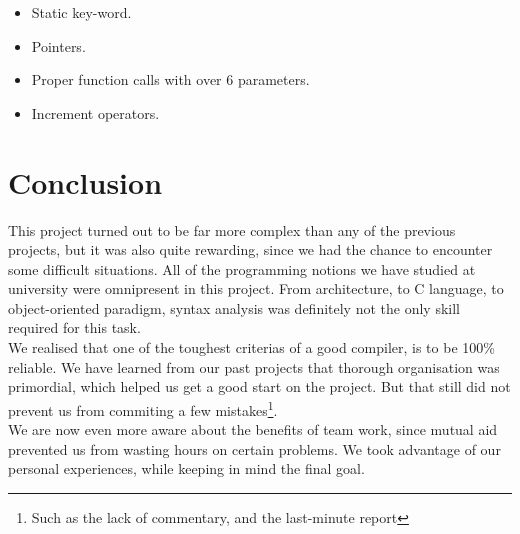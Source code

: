 \documentclass{scrartcl}
\begin{document}
\begin{itemize}
\item Static key-word.
\item Pointers.
\item Proper function calls with over 6 parameters.
\item Increment operators.
\end{itemize}

\section{Conclusion}
This project turned out to be far more complex than any of the previous projects, but it was also quite rewarding, since we had the chance to encounter some difficult situations. All of the programming notions we have studied at university were omnipresent in this project. From architecture, to C language, to object-oriented paradigm, syntax analysis was definitely not the only skill required for this task.\\

We realised that one of the toughest criterias of a good compiler, is to be 100\% reliable.
We have learned from our past projects that thorough organisation was primordial, which helped us get a good start on the project. But that still did not prevent us from commiting a few mistakes\footnote{Such as the lack of commentary, and the last-minute report}.\\

We are now even more aware about the benefits of team work, since mutual aid prevented us from wasting hours on certain problems. We took advantage of our personal experiences, while keeping in mind the final goal.
\end{document}
